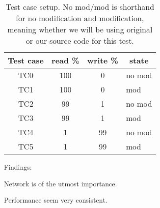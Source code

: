 \begin{center}
\begin{table}[h]
	\begin{tabular}{|c|c|c|l|}
		\multicolumn{1}{c}{Test case} & 
		\multicolumn{1}{c}{read \%} & 
		\multicolumn{1}{c}{write \%} & 
		\multicolumn{1}{c}{state} \\
		\hline

		TC0 & 100 & 0 & no mod \\
		TC1 & 100 & 0 & mod \\
		TC2 & 99 & 1 & no mod \\
		TC3 & 99 & 1 & mod \\
		TC4 & 1 & 99 & no mod \\
		TC5 & 1 & 99 & mod \\

		\hline
	\end{tabular}
	\caption{Test case setup. No mod/mod is shorthand for no modification and modification, meaning whether we will be using original or our source code for this test.}
	\label{tbl:testcases}
\end{table}
\end{center}

Findings:

Network is of the utmost importance.

Performance seem very consistent.

